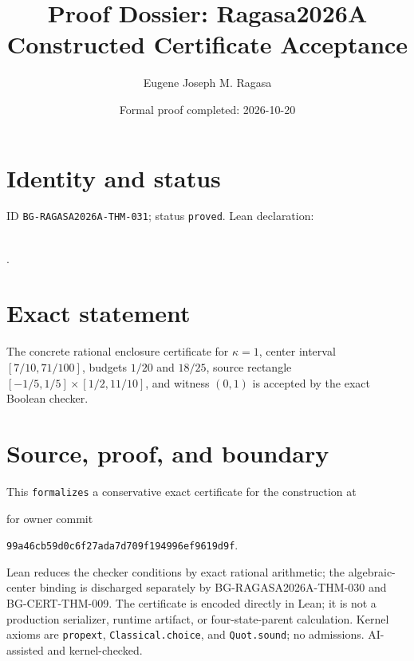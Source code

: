 \documentclass[11pt]{article}
\title{Proof Dossier: Ragasa2026A Constructed Certificate Acceptance}\author{Eugene Joseph M. Ragasa}\date{Formal proof completed: 2026-10-20}
\begin{document}
\maketitle
\section{Identity and status}
ID \texttt{BG-RAGASA2026A-THM-031}; status \texttt{proved}. Lean declaration:
\par{}\\
{\tiny{}}.
\section{Exact statement}
The concrete rational enclosure certificate for $\kappa=1$, center interval
$[7/10,71/100]$, budgets $1/20$ and $18/25$, source rectangle
$[-1/5,1/5]\times[1/2,11/10]$, and witness $(0,1)$ is accepted by the exact Boolean
checker.
\section{Source, proof, and boundary}
This \texttt{formalizes} a conservative exact certificate for the construction at
\begin{center}\small{}\end{center}
for owner commit
\begin{center}\small\texttt{99a46cb59d0c6f27ada7d709f194996ef9619d9f}.\end{center}
Lean reduces the checker conditions by
exact rational arithmetic; the algebraic-center binding is discharged separately by
BG-RAGASA2026A-THM-030 and BG-CERT-THM-009. The certificate is encoded directly in Lean;
it is not a production serializer, runtime artifact, or four-state-parent calculation.
Kernel axioms are \texttt{propext}, \texttt{Classical.choice}, and
\texttt{Quot.sound}; no admissions. AI-assisted and kernel-checked.
\end{document}
